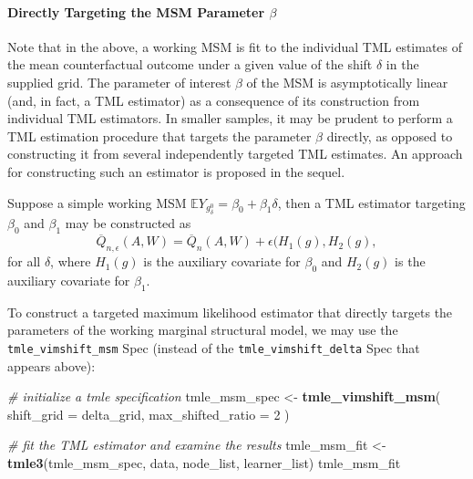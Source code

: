 \documentclass[12pt, krantz2,]{krantz}
\newenvironment{Shaded}{\begin{snugshade}}{\end{snugshade}}
\newcommand{\CommentTok}[1]{\textcolor[rgb]{0.37,0.37,0.37}{\textit{#1}}}
\newcommand{\DataTypeTok}[1]{\textcolor[rgb]{0.27,0.27,0.27}{#1}}
\newcommand{\DecValTok}[1]{\textcolor[rgb]{0.06,0.06,0.06}{#1}}
\newcommand{\KeywordTok}[1]{\textcolor[rgb]{0.27,0.27,0.27}{\textbf{#1}}}
\newcommand{\NormalTok}[1]{#1}
\newcommand{\StringTok}[1]{\textcolor[rgb]{0.5,0.5,0.5}{#1}}
\let\oldparagraph\paragraph
\renewcommand{\paragraph}[1]{\oldparagraph{#1}\mbox{}}
\theoremstyle{definition}
\theoremstyle{definition}
\theoremstyle{definition}
\newcommand{\1}{\mathbbm{1}}
\begin{document}
\hypertarget{directly-targeting-the-msm-parameter-beta}{%
\paragraph{\texorpdfstring{Directly Targeting the MSM Parameter \(\beta\)}{Directly Targeting the MSM Parameter \textbackslash{}beta}}\label{directly-targeting-the-msm-parameter-beta}}

Note that in the above, a working MSM is fit to the individual TML estimates of
the mean counterfactual outcome under a given value of the shift \(\delta\) in the
supplied grid. The parameter of interest \(\beta\) of the MSM is asymptotically
linear (and, in fact, a TML estimator) as a consequence of its construction from
individual TML estimators. In smaller samples, it may be prudent to perform a
TML estimation procedure that targets the parameter \(\beta\) directly, as opposed
to constructing it from several independently targeted TML estimates. An
approach for constructing such an estimator is proposed in the sequel.

Suppose a simple working MSM \(\mathbb{E}Y_{g^0_{\delta}} = \beta_0 + \beta_1 \delta\), then a TML estimator targeting \(\beta_0\) and \(\beta_1\) may be
constructed as
\[\overline{Q}_{n, \epsilon}(A,W) = \overline{Q}_n(A,W) + \epsilon (H_1(g),
H_2(g),\] for all \(\delta\), where \(H_1(g)\) is the auxiliary covariate for
\(\beta_0\) and \(H_2(g)\) is the auxiliary covariate for \(\beta_1\).

To construct a targeted maximum likelihood estimator that directly targets the
parameters of the working marginal structural model, we may use the
\texttt{tmle\_vimshift\_msm} Spec (instead of the \texttt{tmle\_vimshift\_delta} Spec that
appears above):

\begin{Shaded}
\begin{Highlighting}[]
\CommentTok{# initialize a tmle specification}
\NormalTok{tmle_msm_spec <-}\StringTok{ }\KeywordTok{tmle_vimshift_msm}\NormalTok{(}
  \DataTypeTok{shift_grid =}\NormalTok{ delta_grid,}
  \DataTypeTok{max_shifted_ratio =} \DecValTok{2}
\NormalTok{)}

\CommentTok{# fit the TML estimator and examine the results}
\NormalTok{tmle_msm_fit <-}\StringTok{ }\KeywordTok{tmle3}\NormalTok{(tmle_msm_spec, data, node_list, learner_list)}
\NormalTok{tmle_msm_fit}
\end{Highlighting}
\end{Shaded}
\end{document}
